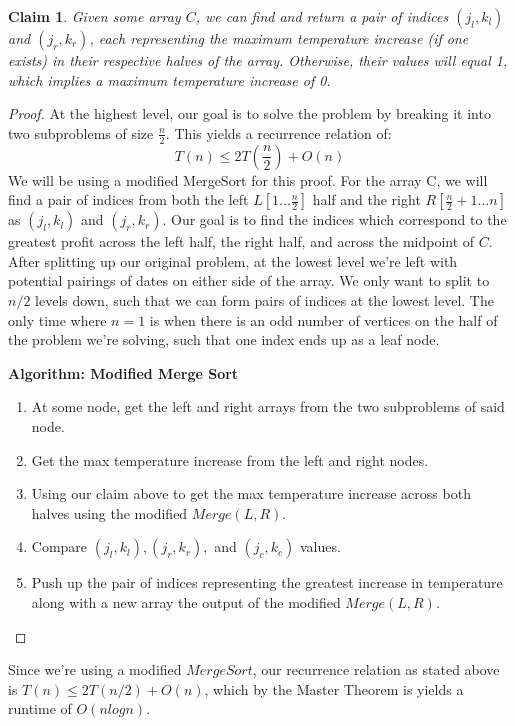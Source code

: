 \documentclass[11pt]{article}
\newtheorem{claim}[theorem]{Claim}
\begin{document}
\begin{claim} 
Given some array $C$, we can find and return a pair of indices $(j_l, k_l)$ and $(j_r, k_r)$, each representing the maximum temperature increase (if one exists) in their respective halves of the array. Otherwise, their values will equal 1, which implies a maximum temperature increase of 0.
\end{claim}
\begin{proof}
At the highest level, our goal is to solve the problem by breaking it into two subproblems of size $\frac{n}{2}$. This yields a recurrence relation of:
\begin{equation}
	T(n) \leq 2T(\frac{n}{2}) + O(n)
\end{equation}
We will be using a modified MergeSort for this proof.
For the array C, we will find a pair of indices from both the left  $L[1...\frac{n}{2}]$ half and the right $R[\frac{n}{2}+1...n]$ as $(j_l, k_l)$ and $(j_r, k_r)$.
Our goal is to find the indices which correspond to the greatest profit across the left half, the right half, and across the midpoint of $C$.\\

After splitting up our original problem, at the lowest level we're left with potential pairings of dates on either side of the array. We only want to split to $n/2$ levels down, such that we can form pairs of indices at the lowest level. The only time where $n = 1$ is when there is an odd number of vertices  on the half of the problem we're solving, such that one index ends up as a leaf node.

\textbf{Algorithm: Modified Merge Sort}
\begin{enumerate}
\item At some node, get the left and right arrays from the two subproblems of said node.
\item Get the max temperature increase from the left and right nodes.
\item Using our claim above to get the max temperature increase across both halves using the modified $Merge(L,R)$.
\item Compare $(j_l, k_l), (j_r, k_r),$ and $(j_c,  k_c)$ values.
\item Push up the pair of indices representing the greatest increase in temperature along with a new array the output of the modified $Merge(L,R)$.
\end{enumerate}
\end{proof}

Since we're using a modified $MergeSort$, our recurrence relation as stated above is $T(n) \leq 2T(n/2) + O(n)$, which by the Master Theorem is yields a runtime of $O(nlogn)$.
\end{document}
